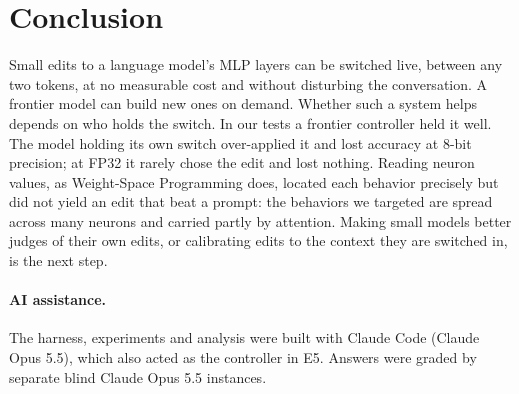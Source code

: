 \section{Conclusion}
Small edits to a language model's MLP layers can be switched live, between any two tokens, at no measurable cost and without disturbing the conversation. A frontier model can build new ones on demand. Whether such a system helps depends on who holds the switch. In our tests a frontier controller held it well. The model holding its own switch over-applied it and lost accuracy at 8-bit precision; at FP32 it rarely chose the edit and lost nothing. Reading neuron values, as Weight-Space Programming does, located each behavior precisely but did not yield an edit that beat a prompt: the behaviors we targeted are spread across many neurons and carried partly by attention. Making small models better judges of their own edits, or calibrating edits to the context they are switched in, is the next step.

\paragraph{AI assistance.} The harness, experiments and analysis were built with Claude Code (Claude Opus 5.5), which also acted as the controller in E5. Answers were graded by separate blind Claude Opus 5.5 instances.
